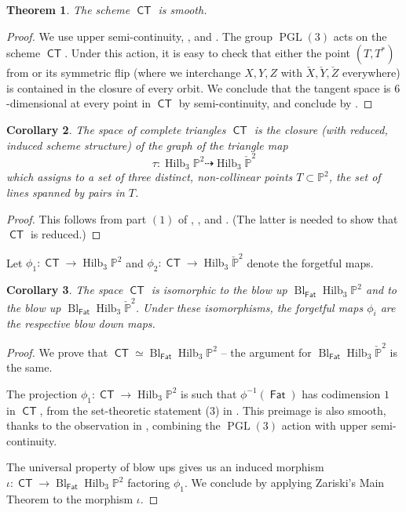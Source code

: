 \documentclass[reqno, 11pt]{amsart}
\theoremstyle{plain}
\newtheorem{theorem}{Theorem}[section]
\newtheorem{corollary}[theorem]{Corollary}
\theoremstyle{remark}
\renewcommand{\P}{\mathbb{P}}
\DeclareMathOperator{\PGL}{PGL}
\DeclareMathOperator{\Hilb}{Hilb}
\DeclareMathOperator{\CT}{\mathsf{CT}}
\newcommand{\from}{\colon}
\DeclareMathOperator{\Fat}{\mathsf{Fat}}
\DeclareMathOperator{\Bl}{Bl}
\begin{document}
\begin{theorem}
  \label{thm:smoothCT}
  The scheme $\CT$ is smooth.
\end{theorem}
\begin{proof}
  We use upper semi-continuity, , and
  . The group $\PGL(3)$ acts on the scheme
  $\CT$.  Under this action, it is easy to check that either the point
  $(T, T^{*})$ from  or its symmetric flip
  (where we interchange $X,Y,Z$ with $\check{X},\check{Y},\check{Z}$ everywhere) is contained
  in the closure of every orbit.  We conclude that the tangent space
  is $6$-dimensional at every point in $\CT$ by semi-continuity, and
  conclude by .
\end{proof}

\begin{corollary}\label{cor:closureofgraph}
  The space of complete triangles $\CT$ is the 
  closure (with reduced, induced scheme structure) of the graph of the
  triangle map
  \[
    \tau \from \Hilb_{3}\P^{2} \dashrightarrow \Hilb_{3}\check{\P}^{2}
  \]
  which assigns to a set of three distinct, non-collinear points
  $T \subset \P^{2}$, the set of lines spanned by pairs in $T$.
\end{corollary}

\begin{proof}
  This follows from part $(1)$ of ,
  , and .  (The latter
  is needed to show that $\CT$ is reduced.)
\end{proof}

Let $\phi_{1} \from \CT \to \Hilb_{3}\P^{2}$ and
$\phi_{2} \from \CT \to \Hilb_{3}\check{\P}^{2}$ denote the forgetful maps.
\begin{corollary}
  \label{cor:blow upfat}
  The space $\CT$ is isomorphic to the blow up
  $\Bl_{\Fat}\Hilb_{3}\P^{2}$ and to the blow up
  $\Bl_{\Fat}\Hilb_{3}\check{\P}^{2}$. Under these isomorphisms, the
  forgetful maps $\phi_{i}$ are the respective blow down maps.
\end{corollary}
\begin{proof}
  We prove that $\CT \simeq \Bl_{\Fat}\Hilb_{3}\P^{2}$ -- the argument
  for $\Bl_{\Fat}\Hilb_{3}\check{\P}^{2}$ is the same.

  The projection $\phi_{1} \from \CT \to \Hilb_{3}\P^{2}$ is such that
  $\phi^{-1}(\Fat)$ has codimension $1$ in $\CT$, from the set-theoretic statement (3) in .  This preimage is also smooth, thanks to the observation in , combining the $\PGL(3)$ action with upper semi-continuity.  
  
  The universal property of blow ups gives us an induced morphism
  $\iota \from \CT \to \Bl_{\Fat}\Hilb_{3}\P^{2}$ factoring
  $\phi_{1}$.  We conclude by applying  Zariski's Main Theorem to the
  morphism $\iota$.
\end{proof}
\end{document}
